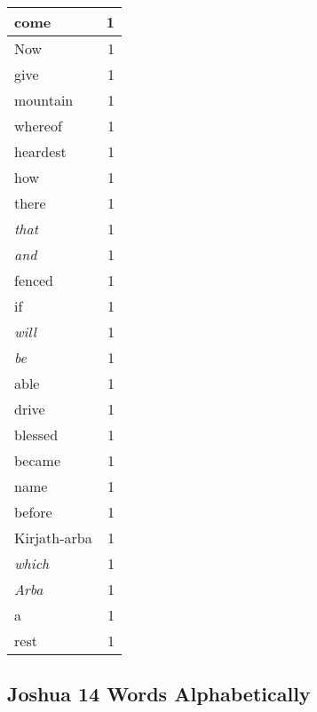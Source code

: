 \begin{center}
\begin{longtable}{l|r}
come & 1\\ \hline 
Now & 1\\ \hline 
give & 1\\ \hline 
mountain & 1\\ \hline 
whereof & 1\\ \hline 
heardest & 1\\ \hline 
how & 1\\ \hline 
there & 1\\ \hline 
\emph{that} & 1\\ \hline 
\emph{and} & 1\\ \hline 
fenced & 1\\ \hline 
if & 1\\ \hline 
\emph{will} & 1\\ \hline 
\emph{be} & 1\\ \hline 
able & 1\\ \hline 
drive & 1\\ \hline 
blessed & 1\\ \hline 
became & 1\\ \hline 
name & 1\\ \hline 
before & 1\\ \hline 
Kirjath-arba & 1\\ \hline 
\emph{which} & 1\\ \hline 
\emph{Arba} & 1\\ \hline 
a & 1\\ \hline 
rest & 1\\ \hline 
\end{longtable}
\end{center}





\subsection{Joshua 14 Words Alphabetically}


\normalsize
 
